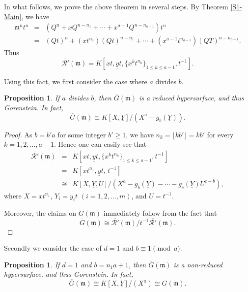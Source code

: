 \documentclass[12pt]{amsart}
\newtheorem{prop}[thm]{Proposition}
\theoremstyle{definition}
\theoremstyle{remark}
\numberwithin{equation}{section}
\newcommand{\m}{{\mathfrak m}}
\begin{document}
\par \vspace{2mm}
In what follows, we prove the above theorem in several steps.
By Theorem \ref{S1-Main}, we have 
\begin{eqnarray*}
\m^n t^n &=& (Q^n+ xQ^{n-n_1} + \cdots + x^{a-1}Q^{n-n_{a-1}})t^n \\[1mm]
&=& (Qt)^n+ (xt^{n_1})(Qt)^{n-n_1} + \cdots 
+ (x^{a-1}t^{n_{a-1}})(QT)^{n-n_{a-1}}. 
\end{eqnarray*}
Thus 
\[
\overline{\mathcal{R}'}(\m) = K[xt,\underline{y}t,\{x^kt^{n_k}\}_{1 \le k \le a-1},t^{-1}]. 
\]
\par 
Using this fact, we first consider the case where $a$ divides $b$.  

\begin{prop} \label{daNGT}
If $a$ divides $b$, then $\overline{G}(\m)$ is a reduced hypersurface, and thus Gorenstein. In fact, 
\[
\overline{G}(\m)  \cong 
K[X, \underline{Y}]/(X^a - g_b(\underline{Y})). 
\]
\end{prop}

\begin{proof}
As $b=b'a$ for some integer $b' \ge 1$, we have $n_k=\lfloor kb' \rfloor =kb'$ for every $k=1,2,\ldots,a-1$.  
Hence one can easily see that 
\begin{eqnarray*}
\overline{\mathcal{R}'}(\m) 
&=& K[xt, \underline{y}t, \{x^kt^{n_k}\}_{1 \le k \le a-1}, t^{-1}] \\
&=& K[xt^{n_1}, \underline{y}t, \,t^{-1}] \\
& \cong &  K[X, \underline{Y},U]/
(X^a-g_b(\underline{Y})-\cdots-g_c(\underline{Y})U^{c-b}),  
\end{eqnarray*}
where $X=xt^{n_1}$, $Y_i=y_it$ $(i=1,2,\ldots,m)$, and $U=t^{-1}$. 
\par \vspace{2mm} 
Moreover, the claims on $G(\m)$ 
immediately follow from the fact that 
\[
\overline{G}(\m) \cong \overline{\mathcal{R}'}(\m)/t^{-1}
\overline{\mathcal{R}'}(\m).
\] 
\end{proof}


Secondly we consider the case of $d=1$ and $b \equiv 1 \pmod{a}$. 

\begin{prop} \label{dequiv1PC}
If $d=1$ and $b=n_1a+1$, then 
$\overline{G}(\m)$ is a non-reduced hypersurface, and thus Gorenstein. 
In fact, 
\[
\overline{G}(\m) 
 \cong  K[X,\underline{Y}]/(X^a) \cong G(\m).  
\]
\end{prop}
\end{document}
